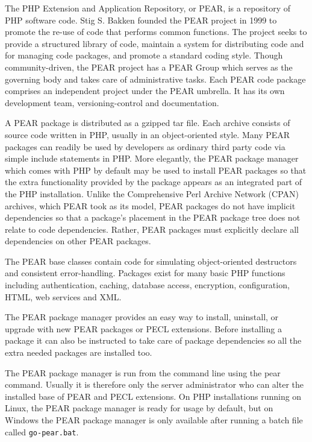The PHP Extension and Application Repository, or PEAR\cite{PEAR}, is a repository of PHP software code. Stig S. Bakken founded the PEAR project in 1999 to promote the re-use of code that performs common functions. The project seeks to provide a structured library of code, maintain a system for distributing code and for managing code packages, and promote a standard coding style. Though community-driven, the PEAR project has a PEAR Group which serves as the governing body and takes care of administrative tasks. Each PEAR code package comprises an independent project under the PEAR umbrella. It has its own development team, versioning-control and documentation.


A PEAR package is distributed as a gzipped tar file. Each archive consists of source code written in PHP, usually in an object-oriented style. Many PEAR packages can readily be used by developers as ordinary third party code via simple include statements in PHP. More elegantly, the PEAR package manager which comes with PHP by default may be used to install PEAR packages so that the extra functionality provided by the package appears as an integrated part of the PHP installation. Unlike the Comprehensive Perl Archive Network (CPAN) archives, which PEAR took as its model, PEAR packages do not have implicit dependencies so that a package's placement in the PEAR package tree does not relate to code dependencies. Rather, PEAR packages must explicitly declare all dependencies on other PEAR packages.

The PEAR base classes contain code for simulating object-oriented destructors and consistent error-handling. Packages exist for many basic PHP functions including authentication, caching, database access, encryption, configuration, HTML, web services and XML.

The PEAR package manager provides an easy way to install, uninstall, or upgrade with new PEAR packages or PECL extensions. Before installing a package it can also be instructed to take care of package dependencies so all the extra needed packages are installed too.

The PEAR package manager is run from the command line using the pear command. Usually it is therefore only the server administrator who can alter the installed base of PEAR and PECL extensions. On PHP installations running on Linux, the PEAR package manager is ready for usage by default, but on Windows the PEAR package manager is only available after running a batch file called \texttt{go-pear.bat}.

